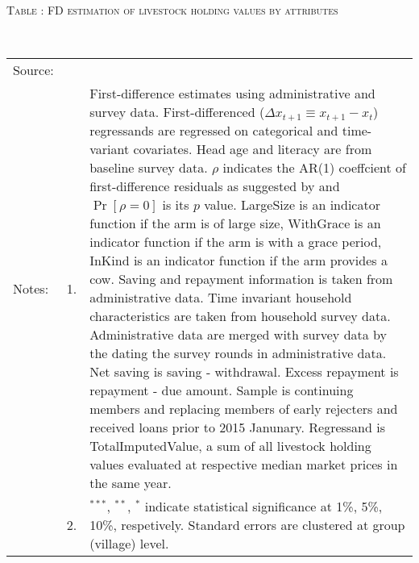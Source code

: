\hspace{-1cm}\begin{minipage}[t]{14cm}
\hfil\textsc{\normalsize Table \thetable: FD estimation of livestock holding values by attributes\label{tab FD livestock attributes original HH}}\\
\setlength{\tabcolsep}{1pt}
\setlength{\baselineskip}{8pt}
\renewcommand{\arraystretch}{.55}
\hfil{}\\
\renewcommand{\arraystretch}{.8}
\setlength{\tabcolsep}{1pt}
\begin{tabular}{>{\hfill\scriptsize}p{1cm}<{}>{\hfill\scriptsize}p{.25cm}<{}>{\scriptsize}p{12cm}<{\hfill}}
Source:& \multicolumn{2}{l}{\scriptsize Estimated with GUK administrative and survey data.}\\
Notes: & 1. & First-difference estimates using administrative and survey data. First-differenced ($\Delta x_{t+1}\equiv x_{t+1} - x_{t}$) regressands are regressed on categorical and time-variant covariates. Head age and literacy are from baseline survey data. $\rho$ indicates the AR(1) coeffcient of first-difference residuals as suggested by \citet[][10.71]{Wooldridge2010} and $\Pr[\rho=0]$ is its $p$ value. \textsf{LargeSize} is an indicator function if the arm is of large size, \textsf{WithGrace} is an indicator function if the arm is with a grace period, \textsf{InKind} is an indicator function if the arm provides a cow. Saving and repayment information is taken from administrative data. Time invariant household characteristics are taken from household survey data. Administrative data are merged with survey data by the dating the survey rounds in administrative data. Net saving is saving - withdrawal. Excess repayment is repayment - due amount. Sample is continuing members and replacing members of early rejecters and received loans prior to 2015 Janunary. Regressand is \textsf{TotalImputedValue}, a sum of all livestock holding values evaluated at respective median market prices in the same year. \\
& 2. & ${}^{***}$, ${}^{**}$, ${}^{*}$ indicate statistical significance at 1\%, 5\%, 10\%, respetively. Standard errors are clustered at group (village) level.
\end{tabular}
\end{minipage}



